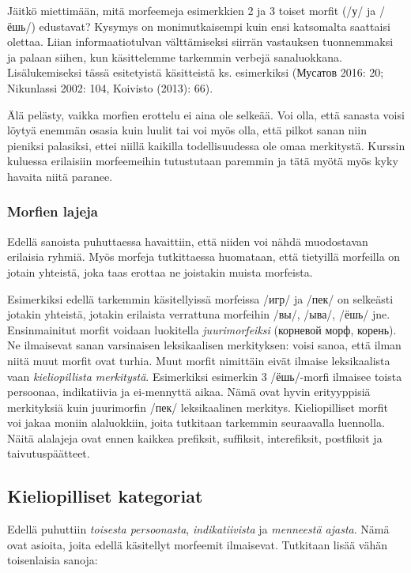 \documentclass[]{scrartcl}
\begin{document}
Jäitkö miettimään, mitä morfeemeja esimerkkien 2 ja 3 toiset morfit (/у/
ja /ёшь/) edustavat? Kysymys on monimutkaisempi kuin ensi katsomalta
saattaisi olettaa. Liian informaatiotulvan välttämiseksi siirrän
vastauksen tuonnemmaksi ja palaan siihen, kun käsittelemme tarkemmin
verbejä sanaluokkana. Lisälukemiseksi tässä esitetyistä käsitteistä ks.
esimerkiksi (Мусатов 2016: 20; Nikunlassi 2002: 104, Koivisto (2013):
66).

Älä pelästy, vaikka morfien erottelu ei aina ole selkeää. Voi olla, että
sanasta voisi löytyä enemmän osasia kuin luulit tai voi myös olla, että
pilkot sanan niin pieniksi palasiksi, ettei niillä kaikilla
todellisuudessa ole omaa merkitystä. Kurssin kuluessa erilaisiin
morfeemeihin tutustutaan paremmin ja tätä myötä myös kyky havaita niitä
paranee.

\subsubsection{Morfien lajeja}\label{morfien-lajeja}

Edellä sanoista puhuttaessa havaittiin, että niiden voi nähdä
muodostavan erilaisia ryhmiä. Myös morfeja tutkittaessa huomataan, että
tietyillä morfeilla on jotain yhteistä, joka taas erottaa ne joistakin
muista morfeista.

Esimerkiksi edellä tarkemmin käsitellyissä morfeissa /игр/ ja /пек/ on
selkeästi jotakin yhteistä, jotakin erilaista verrattuna morfeihin /вы/,
/ыва/, /ёшь/ jne. Ensinmainitut morfit voidaan luokitella
\emph{juurimorfeiksi} (корневой морф, корень). Ne ilmaisevat sanan
varsinaisen leksikaalisen merkityksen: voisi sanoa, että ilman niitä
muut morfit ovat turhia. Muut morfit nimittäin eivät ilmaise
leksikaalista vaan \emph{kieliopillista merkitystä}. Esimerkiksi
esimerkin 3 /ёшь/-morfi ilmaisee toista persoonaa, indikatiivia ja
ei-mennyttä aikaa. Nämä ovat hyvin erityyppisiä merkityksiä kuin
juurimorfin /пек/ leksikaalinen merkitys. Kieliopilliset morfit voi
jakaa moniin alaluokkiin, joita tutkitaan tarkemmin seuraavalla
luennolla. Näitä alalajeja ovat ennen kaikkea prefiksit, suffiksit,
interefiksit, postfiksit ja taivutuspäätteet.

\subsection{Kieliopilliset kategoriat}\label{kieliopilliset-kategoriat}

Edellä puhuttiin \emph{toisesta persoonasta}, \emph{indikatiivista} ja
\emph{menneestä ajasta}. Nämä ovat asioita, joita edellä käsitellyt
morfeemit ilmaisevat. Tutkitaan lisää vähän toisenlaisia sanoja:
\end{document}
